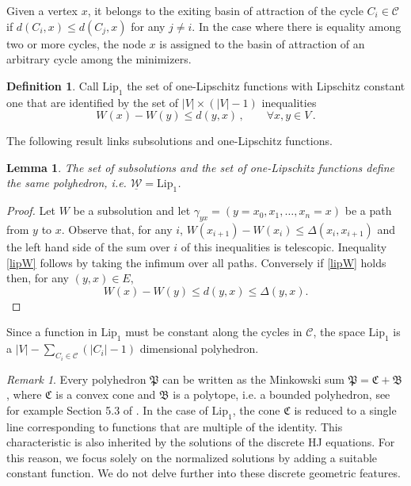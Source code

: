 \documentclass[reqno]{amsart}
\theoremstyle{plain}
\newtheorem{lemma}[theorem]{Lemma}
\theoremstyle{definition}
\newtheorem{definition}[theorem]{Definition}
\theoremstyle{remark}
\newtheorem{remark}[theorem]{Remark}
\numberwithin{equation}{section}
\numberwithin{theorem}{section}
\newcommand{\<}{\langle}
\renewcommand{\>}{\rangle}
\begin{document}
Given a vertex $x$, it belongs to the exiting basin of attraction of the cycle $C_i\in \mathcal C$
if $d(C_i,x)\leq d(C_j,x)$ for any $j\neq i$. In the case where there is equality among two or more cycles, the node  $x$  is assigned to the basin of attraction of an arbitrary cycle among the minimizers.

\begin{definition}
	Call $\mathrm{Lip}_1$  the set of one-Lipschitz functions with Lipschitz constant one that are identified by the set of $|V|\times (|V|-1)$ inequalities
	\begin{equation}\label{lipW}
		W(x)-W(y)\leq d(y,x)\,, \qquad \forall x,y\in V\,.
	\end{equation}
\end{definition}

The following result links subsolutions and one-Lipschitz functions.

\begin{lemma}\label{lometto}
	The set of subsolutions and the set of one-Lipschitz functions define the same polyhedron, i.e. $\underline {\mathcal W}=\mathrm{Lip}_1$.
\end{lemma}
\begin{proof}
	Let $W$ be a subsolution and let $\gamma_{yx}=(y=x_0,x_1,\dots , x_n=x)$ be a path from $y$ to $x$. Observe that, for any $i$, 
	$W(x_{i+1})-W(x_i)\leq \Delta(x_i,x_{i+1})$ and the left hand side of the sum over $i$ of this inequalities is telescopic.  Inequality \eqref{lipW} follows by taking the infimum over all paths. Conversely if \eqref{lipW} holds then, for any $(y,x)\in E$,
	\[
	W(x)-W(y)\leq d(y,x)\leq \Delta(y,x).
	\]
\end{proof}
Since a function in $\mathrm{Lip}_1$ must be constant along the cycles in $\mathcal C$, the space  $\mathrm{Lip}_1$ is a $|V|-\sum_{C_i\in \mathcal C}(|C_i|-1)$ dimensional polyhedron.\\


\begin{remark}
	Every polyhedron $\mathfrak{P}$ can be written as the Minkowski sum $\mathfrak{P}=\mathfrak{C}+\mathfrak{B}$, where $\mathfrak{C}$ is a convex cone and $\mathfrak{B}$ is a polytope, i.e. a bounded polyhedron, see for example Section 5.3 of \cite{Sch}. In the case of $\mathrm{Lip}_1$, the cone $\mathfrak{C}$ is reduced to a single line corresponding to functions that are multiple of the identity. This characteristic is also inherited by the solutions of the discrete HJ equations. For this reason, we focus solely on the normalized solutions by adding a suitable constant function. We do not delve further into these discrete geometric features.
\end{remark}
\end{document}
